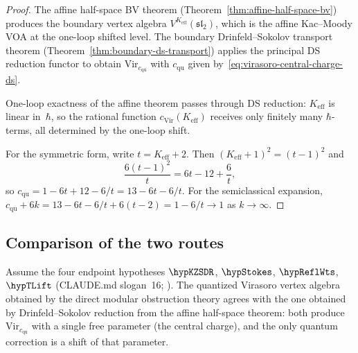 \begin{proof}
The affine half-space BV theorem
(Theorem~\ref{thm:affine-half-space-bv}) produces the boundary
vertex algebra $V^{K_{\mathrm{eff}}}(\mathfrak{sl}_2)$, which is the
affine Kac--Moody VOA at the one-loop shifted level. The boundary
Drinfeld--Sokolov transport theorem
(Theorem~\ref{thm:boundary-ds-transport}) applies the principal DS
reduction functor to obtain $\mathrm{Vir}_{c_{\mathrm{qu}}}$ with
$c_{\mathrm{qu}}$ given by~\eqref{eq:virasoro-central-charge-ds}.

One-loop exactness of the affine theorem passes through DS reduction:
$K_{\mathrm{eff}}$ is linear in~$\hbar$, so the rational function
$c_{\mathrm{Vir}}(K_{\mathrm{eff}})$ receives only finitely many
$\hbar$-terms, all determined by the one-loop shift.

For the symmetric form, write $t = K_{\mathrm{eff}} + 2$. Then
$(K_{\mathrm{eff}}+1)^2 = (t-1)^2$ and
\[
\frac{6(t-1)^2}{t} = 6t - 12 + \frac{6}{t},
\]
so $c_{\mathrm{qu}} = 1 - 6t + 12 - 6/t = 13 - 6t - 6/t$. For the
semiclassical expansion, $c_{\mathrm{qu}} + 6k
= 13 - 6t - 6/t + 6(t-2) = 1 - 6/t \to 1$ as $k\to\infty$.
\end{proof}

\subsection{Comparison of the two routes}
\label{subsec:virasoro-comparison}

\begin{theorem}
\label{thm:virasoro-consistency}
Assume the four endpoint hypotheses $\hypKZSDR$, $\hypStokes$,
$\hypReflWts$, $\hypTLift$ (CLAUDE.md slogan~\textup{16};
\cite{KZ25,Costello2011Renorm,CG17,LurieHA}).
The quantized Virasoro vertex algebra obtained by the direct modular
obstruction theory agrees with the one obtained by Drinfeld--Sokolov
reduction from the affine half-space theorem: both produce
$\mathrm{Vir}_{c_{\mathrm{qu}}}$ with a single free parameter
(the central charge), and the only quantum correction is a shift of that
parameter.
\end{theorem}

